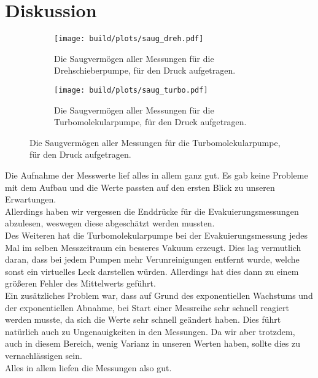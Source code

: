 \newpage
\section{Diskussion}



\begin{figure}[ht]
    \begin{subfigure}{0.46\textwidth}
            \centering
            \texttt{[image: build/plots/saug\_dreh.pdf]}
            \label{img:saug_dreh}
            \caption{Die Saugvermögen aller Messungen für die Drehschieberpumpe, für den Druck aufgetragen.}
    \end{subfigure}
    \hfill
    \begin{subfigure}{0.46\textwidth}
            \centering
            \texttt{[image: build/plots/saug\_turbo.pdf]}
            \label{img:saug_turbo}
            \caption{Die Saugvermögen aller Messungen für die Turbomolekularpumpe, für den Druck aufgetragen.}
    \end{subfigure}
    \label{img:saug}
\end{figure}


\noindent Die Aufnahme der Messwerte lief alles in allem ganz gut. Es gab keine Probleme mit dem Aufbau und die Werte passten auf den ersten Blick zu unseren Erwartungen.\\
Allerdings haben wir vergessen die Enddrücke für die Evakuierungsmessungen abzulesen, weswegen diese abgeschätzt werden mussten.\\
Des Weiteren hat die Turbomolekularpumpe bei der Evakuierungsmessung jedes Mal im selben Messzeitraum ein besseres Vakuum erzeugt. 
Dies lag vermutlich daran, dass bei jedem Pumpen mehr Verunreinigungen entfernt wurde, welche sonst ein virtuelles Leck darstellen würden. 
Allerdings hat dies dann zu einem größeren Fehler des Mittelwerts geführt.\\
Ein zusätzliches Problem war, dass auf Grund des exponentiellen Wachstums und der exponentiellen Abnahme, bei Start einer Messreihe sehr schnell reagiert werden musste, da sich die Werte sehr schnell geändert haben.
Dies führt natürlich auch zu Ungenauigkeiten in den Messungen. Da wir aber trotzdem, auch in diesem Bereich, wenig Varianz in unseren Werten haben, sollte dies zu vernachlässigen sein.\\
Alles in allem liefen die Messungen also gut.\\\\

